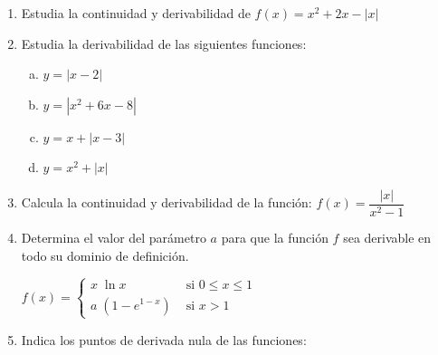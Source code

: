 \begin{enumerate}
		
		
		\item Estudia la continuidad y derivabilidad de $f(x)=x^2+2x-|x|$
		
		
		
		\item Estudia la derivabilidad de las siguientes funciones:
		
		\begin{multicols}{2}
		\begin{enumerate}[a) ]
			\item $y=|x-2|$
			\item $y=|x^2+6x-8|$
			\item $y=x+|x-3|$ 
			\item $y=x^2+|x|$
		\end{enumerate}
			
		\end{multicols}

		
		
		\item Calcula la continuidad y derivabilidad de la función: $f(x)=\dfrac {|x|}{x^2-1}$
		
		
		
		\item Determina el valor del parámetro $a$ para que la función $f$ sea derivable en todo su dominio de definición.
		
		$f(x)=
	\begin{cases}
	x\; \ln x & \mbox{ si } 0\le  x \le 1 \\
		a\; (1-e^{1-x}) & \mbox{ si } x>1  
	\end{cases} $
		
		\rightline{\textcolor{gris}{Solución: $a=1$}}
		
		\item Indica los puntos de derivada nula de las funciones:
		

\end{enumerate}
